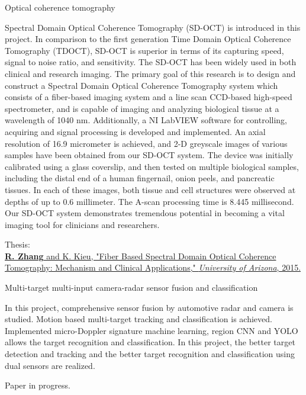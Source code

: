 \documentclass[letterpaper,9pt]{article}
\renewenvironment{itemize}{
  \begin{list}{}{
    \setlength{\topsep}{0pt}
    \setlength{\itemsep}{0pt}
    \setlength{\parsep}{0pt}
    \setlength{\partopsep}{0pt}
    \setlength{\leftmargin}{1.5em}
  }
}{\end{list}}
\begin{document}
\begin{itemize}
  \item Optical coherence tomography
  \begin{itemize}
    \item [$\bullet$] Spectral Domain Optical Coherence Tomography (SD-OCT) is introduced in this project. In comparison to the first generation Time Domain Optical Coherence Tomography (TDOCT), SD-OCT is superior in terms of its capturing speed, signal to noise ratio, and sensitivity. The SD-OCT has been widely used in both clinical and research imaging. The primary goal of this research is to design and construct a Spectral Domain Optical Coherence Tomography system which consists of a fiber-based imaging system and a line scan CCD-based high-speed spectrometer, and is capable of imaging and analyzing biological tissue at a wavelength of 1040 nm. Additionally, a NI LabVIEW software for controlling, acquiring and signal processing is developed and implemented. An axial resolution of 16.9 micrometer is achieved, and 2-D greyscale images of various samples have been obtained from our SD-OCT system. The device was initially calibrated using a glass coverslip, and then tested on multiple biological samples, including the distal end of a human fingernail, onion peels, and pancreatic tissues. In each of these images, both tissue and cell structures were observed at depths of up to 0.6 millimeter. The A-scan processing time is 8.445 millisecond. Our SD-OCT system demonstrates tremendous potential in becoming a vital imaging tool for clinicians and researchers.
    \item [$\bullet$] Thesis: \\
    \href{https://scholar.google.com/citations?view_op=view_citation&hl=en&user=PpPf3BoAAAAJ&citation_for_view=PpPf3BoAAAAJ:9yKSN-GCB0IC}{{\bf R. Zhang} and K. Kieu, "Fiber Based Spectral Domain Optical Coherence Tomography: Mechanism and Clinical Applications," {\it University of Arizona}, 2015.}
  \end{itemize}

  \item Multi-target multi-input camera-radar sensor fusion and classification
  \begin{itemize}
    \item [$\bullet$] In this project, comprehensive sensor fusion by automotive radar and camera is studied. Motion based multi-target tracking and classification is achieved. Implemented micro-Doppler signature machine learning, region CNN and YOLO allows the target recognition and classification. In this project, the better target detection and tracking and the better target recognition and classification using dual sensors are realized.
    \item [$\bullet$] Paper in progress.
  \end{itemize}


\end{itemize}
\end{document}
